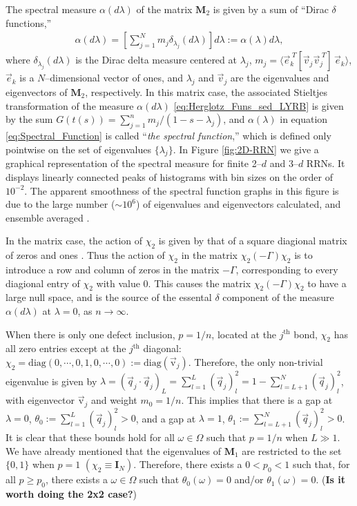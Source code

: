 \documentclass[english,12pt,jmp,graphicx]{revtex4-1}
\begin{document}
The spectral measure $\alpha(d\lambda)$ of the matrix $\mathbf{M}_2$ is given by
a sum of ``Dirac $\delta$ functions,''
%
\begin{align}\label{eq:Spectral_Function}
  \alpha(d\lambda)=
    \left[\sum_{j=1}^N m_j \delta_{\lambda_j}(d\lambda)\right]d\lambda
      :=\alpha(\lambda)d\lambda,
\end{align}
%
where $\delta_{\lambda_j}(d\lambda)$ is the Dirac delta measure centered at $\lambda_j$,
$m_j=\langle\vec{e}_k^{\;T}[\vec{v}_j\vec{v}_j^{\;T}]\,\vec{e}_k\rangle$, 
$\vec{e}_k$ is a $N$--dimensional vector of ones, and $\lambda_j$ and
$\vec{v}_j$ are the eigenvalues and eigenvectors of $\mathbf{M}_2$,
respectively. In this matrix case, the associated Stieltjes
transformation of the measure $\alpha(d\lambda)$ \eqref{eq:Herglotz_Funs_sed_LYRB} is
given by the sum $G(t(s))=\sum_{j=1}^nm_j/(1-s-\lambda_j)$, and $\alpha(\lambda)$ in equation
\eqref{eq:Spectral_Function} is called ``\emph{the spectral
  function},'' which is defined only pointwise on the set of
eigenvalues $\{\lambda_j\}$. In Figure \ref{fig:2D-RRN} we give a graphical
representation of the spectral measure for finite 2--$d$ and 3--$d$
RRNs. It displays linearly connected peaks of histograms with bin
sizes on the order of $10^{-2}$. The apparent smoothness of the
spectral function graphs in this figure is due to the large number
($\sim10^6$) of eigenvalues and eigenvectors calculated, and ensemble
averaged \cite{Golden:JoB:337}. 

In the matrix case, the action of $\chi_2$ is given by that of a square
diagional matrix of zeros and ones \cite{Golden:JoB:337}. Thus
the action of $\chi_2$ in the matrix $\chi_2(-\Gamma)\chi_2$ is to introduce a row
and column of zeros in the matrix $-\Gamma$, corresponding to every
diagional entry of $\chi_2$ with value 0. This causes the matrix
$\chi_2(-\Gamma)\chi_2$ to have a large null space, and is the source of the
essental $\delta$ component of the measure $\alpha(d\lambda)$ at $\lambda=0$, as
$n\to\infty$.

When there is only one defect inclusion, $p=1/n$, located at
the $j^{\text{th}}$ bond, $\chi_2$ has all zero entries except at the $j^{\text{th}}$
diagonal:
$\chi_2=\text{diag}(0,\cdots,0,1,0,\cdots,0):=\text{diag}(\vec{\text{v}}_j)$. Therefore,
the only non-trivial eigenvalue is given by 
$\lambda=(\vec{q}_j\cdot\vec{q}_j)_L=\sum_{l=1}^L(\vec{q}_j)_l^2=1-\sum_{l=L+1}^N(\vec{q}_j)_l^2$, 
with eigenvector $\vec{\text{v}}_j$ and weight $m_0=1/n$. This  
implies that there is a gap at $\lambda=0$, $\theta_0:=\sum_{l=1}^L(\vec{q}_j)_l^2>0$,
and a gap at $\lambda=1$, $\theta_1:=\sum_{l=L+1}^N(\vec{q}_j)_l^2>0$. It is clear
that these bounds hold for all $\omega\in\Omega$ such that $p=1/n$ when $L\gg1$. We
have already mentioned that the eigenvalues of $\mathbf{M}_1$ are
restricted to the set $\{0,1\}$ when $p=1$
$(\chi_2\equiv\mathbf{I}_N)$. Therefore, there exists a $0<p_0<1$ such that,
for all $p\geq p_0$, there exists a $\omega\in\Omega$ such that $\theta_0(\omega)=0$ and/or
$\theta_1(\omega)=0$. (\textbf{Is it worth doing the 2x2 case?})
\end{document}
